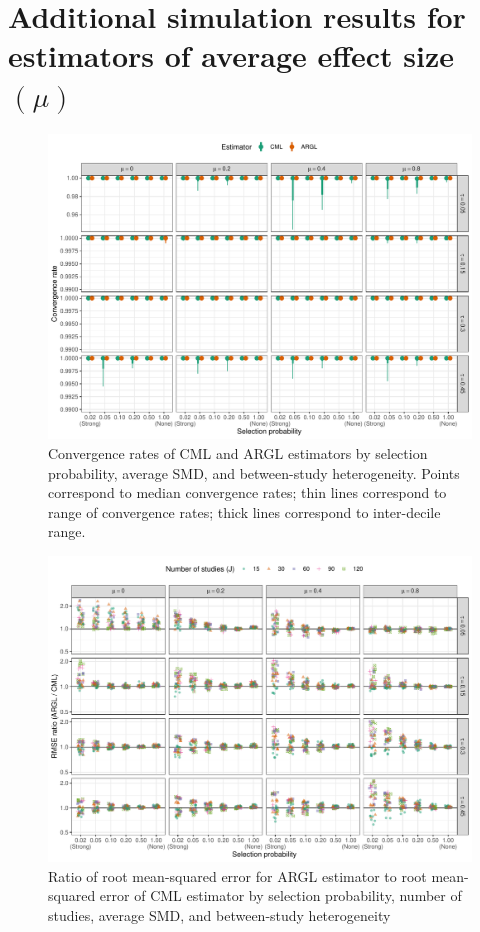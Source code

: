 \documentclass[
  american,
  man, donotrepeattitle,floatsintext]{apa7}
\begin{document}
\section{\texorpdfstring{Additional simulation results for estimators of average effect size \((\mu)\)}{Additional simulation results for estimators of average effect size (\textbackslash mu)}}\label{mu-simulation-results}

\begin{figure}
\includegraphics{step-function-selection-models-with-dependent-effects_files/figure-latex/convergence-rates-1} \caption{Convergence rates of CML and ARGL estimators by selection probability, average SMD, and between-study heterogeneity. Points correspond to median convergence rates; thin lines correspond to range of convergence rates; thick lines correspond to inter-decile range.}\label{fig:convergence-rates}
\end{figure}

\begin{figure}
\includegraphics{step-function-selection-models-with-dependent-effects_files/figure-latex/rmse-ARGL-CML-1} \caption{Ratio of root mean-squared error for ARGL estimator to root mean-squared error of CML estimator by selection probability, number of studies, average SMD, and between-study heterogeneity}\label{fig:rmse-ARGL-CML}
\end{figure}
\end{document}
